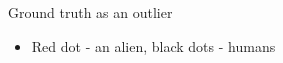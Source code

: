 \documentclass{beamer}
\begin{document}
\begin{darkframes}
\begin{frame}{Ground truth as an outlier}
    \begin{itemize}
        \item Red dot - an alien, black dots - humans
    \end{itemize}
    \begin{figure}
    \captionsetup[subfigure]{labelformat=empty}
     \centering
	\end{figure}
    
\end{frame}


\end{darkframes}
\end{document}
